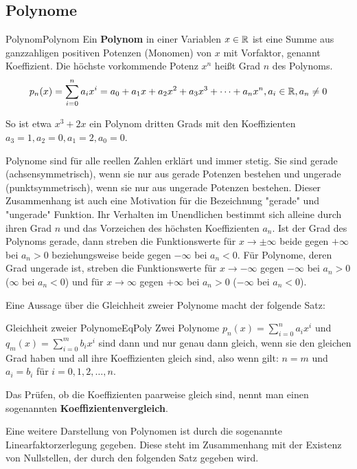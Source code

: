 \subsection{Polynome}

\begin{definition}{Polynom}{Polynom}
    Ein \textbf{Polynom} in einer Variablen $x\in \mathbb{R}$ ist eine Summe aus ganzzahligen positiven Potenzen (Monomen) von $x$ mit Vorfaktor, genannt Koeffizient. Die höchste vorkommende Potenz $x^n$ heißt Grad $n$ des Polynoms.
    $$
        p_n(x) = \sum\limits_{i=0}^n a_i x^i = a_0 + a_1 x + a_2 x^2 + a_3 x^3 + \dots + a_n x^n, a_i \in \mathbb{R}, a_n \ne 0
    $$
\end{definition}

So ist etwa $x^3+2x$ ein Polynom dritten Grads mit den Koeffizienten $a_3 = 1, a_2 = 0, a_1 = 2, a_0=0$.

Polynome sind für alle reellen Zahlen erklärt und immer stetig. Sie sind gerade (achsensymmetrisch), wenn sie nur aus gerade Potenzen bestehen und ungerade (punktsymmetrisch), wenn sie nur aus ungerade Potenzen bestehen. Dieser Zusammenhang ist auch eine Motivation für die Bezeichnung "gerade" und "ungerade" Funktion. Ihr Verhalten im Unendlichen bestimmt sich alleine durch ihren Grad $n$ und das Vorzeichen des höchsten Koeffizienten $a_n$. Ist der Grad des Polynoms gerade, dann streben die Funktionswerte für $x\to\pm\infty$ beide gegen $+\infty$ bei $a_n > 0$ beziehungsweise beide gegen $-\infty$ bei $a_n < 0$. Für Polynome, deren Grad ungerade ist, streben die Funktionswerte für $x \to -\infty$ gegen $-\infty$ bei $a_n > 0$ ($\infty$ bei $a_n < 0$) und für $x \to \infty$ gegen $+\infty$ bei $a_n > 0$ ($-\infty$ bei $a_n < 0$).

Eine Aussage über die Gleichheit zweier Polynome macht der folgende Satz:

\begin{statement}{Gleichheit zweier Polynome}{EqPoly}
    Zwei Polynome $p_n(x) = \sum\limits_{i=0}^n a_i x^i$ und $q_m(x) = \sum\limits_{i=0}^m b_i x^i$ sind dann und nur genau dann gleich, wenn sie den gleichen Grad haben und all ihre Koeffizienten gleich sind, also wenn gilt: $n=m$ und $a_i = b_i$ für $i=0,1,2,\dots,n$.
\end{statement}

Das Prüfen, ob die Koeffizienten paarweise gleich sind, nennt man einen sogenannten \textbf{Koeffizientenvergleich}.

Eine weitere Darstellung von Polynomen ist durch die sogenannte Linearfaktorzerlegung gegeben. Diese steht im Zusammenhang mit der Existenz von Nullstellen, der durch den folgenden Satz gegeben wird.

